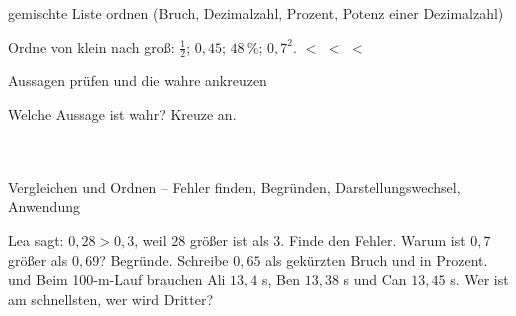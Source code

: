 \begin{aufgabe}{gemischte Liste ordnen (Bruch, Dezimalzahl, Prozent, Potenz einer Dezimalzahl)}
\begin{teile}
\teil Ordne von klein nach groß: $\frac{1}{2}$; $0{,}45$; $48\,\%$; $0{,}7^2$. \leerfeld $<$ \leerfeld $<$ \leerfeld $<$ \leerfeld
\end{teile}
\end{aufgabe}

\begin{aufgabe}{Aussagen prüfen und die wahre ankreuzen}
\begin{teile}
\teil Welche Aussage ist wahr? Kreuze an.\\ \\ \\ 
\end{teile}
\end{aufgabe}

\begin{aufgabe}{Vergleichen und Ordnen – Fehler finden, Begründen, Darstellungswechsel, Anwendung}
\begin{teile}
\teil Lea sagt: $0{,}28 > 0{,}3$, weil $28$ größer ist als $3$. Finde den Fehler.
\teil Warum ist $0{,}7$ größer als $0{,}69$? Begründe.
\teil Schreibe $0{,}65$ als gekürzten Bruch und in Prozent. \leerfeld und \leerfeld[\%]
\teil Beim 100-m-Lauf brauchen Ali $13{,}4$ s, Ben $13{,}38$ s und Can $13{,}45$ s. Wer ist am schnellsten, wer wird Dritter?
\end{teile}
\end{aufgabe}

